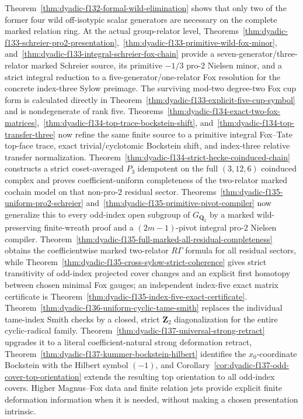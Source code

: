 \documentclass[11pt]{article}
\theoremstyle{definition}
\begin{document}
\begin{enumerate}[label=\textbf{(\arabic*)}]
Theorem~\ref{thm:dyadic-f132-formal-wild-elimination} shows that only two of the former four wild off-isotypic scalar generators are necessary on the complete marked relation ring.  At the actual group-relator level, Theorems~\ref{thm:dyadic-f133-schreier-pro2-presentation},~\ref{thm:dyadic-f133-primitive-wild-fox-minor}, and~\ref{thm:dyadic-f133-integral-schreier-fox-chain} provide a seven-generator/three-relator marked Schreier source, its primitive $-1/3$ pro-$2$ Nielsen minor, and a strict integral reduction to a five-generator/one-relator Fox resolution for the concrete index-three Sylow preimage.  The surviving mod-two degree-two Fox cup form is calculated directly in Theorem~\ref{thm:dyadic-f133-explicit-five-cup-symbol} and is nondegenerate of rank five.  Theorems~\ref{thm:dyadic-f134-exact-two-fox-matrices},~\ref{thm:dyadic-f134-top-trace-bockstein-shift}, and~\ref{thm:dyadic-f134-top-transfer-three} now refine the same finite source to a primitive integral Fox--Tate top-face trace, exact trivial/cyclotomic Bockstein shift, and index-three relative transfer normalization.  Theorem~\ref{thm:dyadic-f134-strict-hecke-coinduced-chain} constructs a strict coset-averaged $P_3$ idempotent on the full $(3,12,6)$ coinduced complex and proves coefficient-uniform completeness of the two-relator marked cochain model on that non-pro-$2$ residual sector.  Theorems~\ref{thm:dyadic-f135-uniform-pro2-schreier} and~\ref{thm:dyadic-f135-primitive-pivot-compiler} now generalize this to every odd-index open subgroup of $G_{\mathbf Q_2}$ by a marked wild-preserving finite-wreath proof and a $(2m-1)$-pivot integral pro-$2$ Nielsen compiler.  Theorem~\ref{thm:dyadic-f135-full-marked-all-residual-completeness} obtains the coefficientwise marked two-relator $R\Gamma$ formula for all residual sectors, while Theorem~\ref{thm:dyadic-f135-cross-sylow-strict-coherence} gives strict transitivity of odd-index projected cover changes and an explicit first homotopy between chosen minimal Fox gauges; an independent index-five exact matrix certificate is Theorem~\ref{thm:dyadic-f135-index-five-exact-certificate}.  Theorem~\ref{thm:dyadic-f136-uniform-cyclic-tame-smith} replaces the individual tame-index Smith checks by a closed, strict $\mathbf Z_2$ diagonalization for the entire cyclic-radical family.  Theorem~\ref{thm:dyadic-f137-universal-strong-retract} upgrades it to a literal coefficient-natural strong deformation retract, Theorem~\ref{thm:dyadic-f137-kummer-bockstein-hilbert} identifies the $x_0$-coordinate Bockstein with the Hilbert symbol $(-1)$, and Corollary~\ref{cor:dyadic-f137-odd-cover-top-orientation} extends the resulting top orientation to all odd-index covers.  Higher Magnus--Fox data and finite relation jets provide explicit finite deformation information when it is needed, without making a chosen presentation intrinsic.


\end{enumerate}
\end{document}
